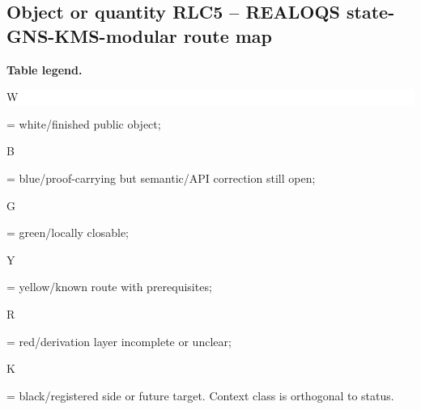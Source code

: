 \subsection*{Object or quantity RLC5 -- REALOQS state-GNS-KMS-modular route map}
\hypertarget{objproof:RLC5}{}
\par\smallskip\noindent\begin{minipage}{0.99\linewidth}\footnotesize\raggedright\textbf{Table legend.} \colorbox{white}{\strut W} = white/finished public object; \colorbox{cyan!20}{\strut B} = blue/proof-carrying but semantic/API correction still open; \colorbox{green!18}{\strut G} = green/locally closable; \colorbox{yellow!25}{\strut Y} = yellow/known route with prerequisites; \colorbox{red!20}{\strut R} = red/derivation layer incomplete or unclear; \colorbox{black!18}{\strut K} = black/registered side or future target. Context class is orthogonal to status.\end{minipage}\par\vspace{0.25em}
